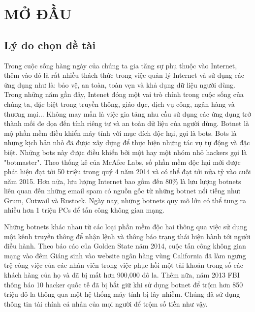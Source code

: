 

\clearpage

\chapter*{MỞ ĐẦU}

\section*{Lý do chọn đề tài}
Trong cuộc sống hàng ngày của chúng ta gia tăng sự phụ thuộc vào Internet, thêm
vào đó là rất nhiều thách thức trong việc quản lý Internet và sử dụng các ứng dụng như
là: bảo vệ, an toàn, toàn vẹn và khả dụng dữ liệu người dùng. Trong những năm gần đây,
Intenet đóng một vai trò chính trong cuộc sống của chúng ta, đặc biệt trong truyền thông,
giáo dục, dịch vụ công, ngân hàng và thương mại... Không may mắn là việc gia tăng nhu
cầu sử dụng các ứng dụng trở thành mối đe dọa đến tính riêng tư và an toàn dữ liệu của
người dùng. Botnet là mộ phần mềm điều khiển máy tính với mục đích độc hại, gọi là
bots. Bots là những kịch bản nhỏ đã được xây dựng để thực hiện những tác vụ tự động và
đặc biệt. Những bots này được điều khiển bởi một hay một nhóm nhỏ hackers gọi là
"botmaster". Theo thống kê của McAfee Labs, số phần mềm độc hại mới được phát hiện
đạt tới 50 triệu trong quý 4 năm 2014 và có thể đạt tới nửa tỷ vào cuối năm 2015. Hơn
nữa, lưu lượng Internet bao gồm đến 80\% là lưu lượng botnets liên quan đến những email
spam có nguồn gốc từ những botnet nổi tiếng như: Grum, Cutwail và Rustock. Ngày nay,
những botnets quy mô lớn có thể tung ra nhiều hơn 1 triệu PCs để tấn công không gian
mạng.

Những botnets khác nhau từ các loại phần mềm độc hai thông qua việc sử dụng một
kênh truyền thông để nhận lệnh và thông báo trạng thái hiện hành tới người điều hành.
Theo báo cáo của Golden State năm 2014, cuộc tấn công không gian mạng vào đêm
Giáng sinh vào website ngân hàng vùng California đã làm ngưng trệ công việc của các
nhân viên trong việc phục hồi một tài khoản trong số các khách hàng của họ và đã bị mất
hơn 900,000 đô la. Thêm nữa, năm 2013 FBI thông báo 10 hacker quốc tế đã bị bắt giữ
khi sử dụng botnet để trộm hơn 850 triệu đô la thông qua một hệ thống máy tính bị lây
nhiễm. Chúng đã sử dụng thông tin tài chính cá nhân của mọi người để trộm số tiền như
vậy.

